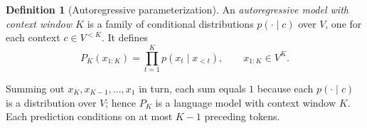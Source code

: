 \documentclass[12pt]{article}
\theoremstyle{definition}
\newtheorem{definition}{Definition}
\theoremstyle{remark}
\begin{document}
\begin{definition}[Autoregressive parameterization]
An \emph{autoregressive model with context window \(K\)}
is a family of conditional distributions
\(p(\cdot \mid c)\) over \(V\), one for each context
\(c \in V^{<K}\). It defines
\[
    P_K(x_{1:K}) = \prod_{t=1}^{K} p(x_t \mid x_{<t}),
    \qquad x_{1:K} \in V^K .
\]
\end{definition}

Summing out \(x_K, x_{K-1}, \dots, x_1\) in turn, each
sum equals \(1\) because each \(p(\cdot \mid c)\) is a
distribution over \(V\); hence \(P_K\) is a language
model with context window \(K\). Each prediction
conditions on at most \(K-1\) preceding tokens.
\end{document}
